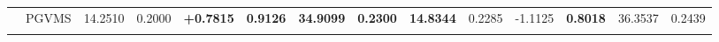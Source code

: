 \documentclass[journal,twoside,web]{ieeecolor}
\begin{document}
\begin{table}[ht]
{\begin{tabular}{c|c|cc|cc|cc|cc|cc|cc}
       \rowcolor{gray!10}
      \multirow{-4}{*}{One-to-many}& PGVMS & 
      14.2510 & 0.2000 & \textbf{+0.7815} & \textbf{0.9126} & \textbf{34.9099} & \textbf{0.2300} & 
      \textbf{14.8344} & 0.2285 & -1.1125 & \textbf{0.8018} & 36.3537 & 0.2439 
      \\
      \Xhline{1.5pt} 
    \end{tabular}
  }
\end{table}


      
      
      
      
\end{document}
